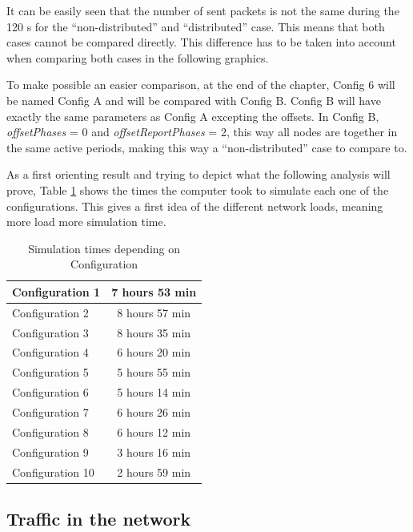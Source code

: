 It can be easily seen that the number of sent packets is not the same during the 120 s for the ``non-distributed'' and ``distributed'' case. This 
means that both cases cannot be compared directly. This difference has to be taken into account when comparing both cases in the following 
graphics.

To make possible an easier 
comparison, at the end of the chapter, Config 6 will be named Config A and will be compared with Config B. Config B will have exactly the same
parameters as Config A excepting the offsets. In Config B, \textit{offsetPhases} = 0 and \textit{offsetReportPhases} = 2, this way all nodes are
together in the same active periods, making this way a ``non-distributed'' case to compare to.


As a first orienting result and trying to depict what the following analysis will prove, Table \ref{tab:simulationtimes} shows the times 
the computer took to simulate each one of the configurations. This gives a first idea of the different network loads, meaning more load more simulation
time.

\begin{table}
 \begin{center}
  \begin{tabular}{|l|c|}
   \hline
   Configuration 1 & 7 hours 53 min \\
   \hline
   Configuration 2 & 8 hours 57 min \\
   \hline
   Configuration 3 & 8 hours 35 min \\
   \hline
   Configuration 4 & 6 hours 20 min \\
   \hline
   Configuration 5 & 5 hours 55 min \\
   \hline
   Configuration 6 & 5 hours 14 min \\
   \hline
   Configuration 7 & 6 hours 26 min \\
   \hline
   Configuration 8 & 6 hours 12 min \\
   \hline
   Configuration 9 & 3 hours 16 min \\
   \hline
   Configuration 10 & 2 hours 59 min \\
   \hline
  \end{tabular}
  \caption{Simulation times depending on Configuration}
  \label{tab:simulationtimes}
 \end{center}
\end{table}

\subsection{Traffic in the network}

